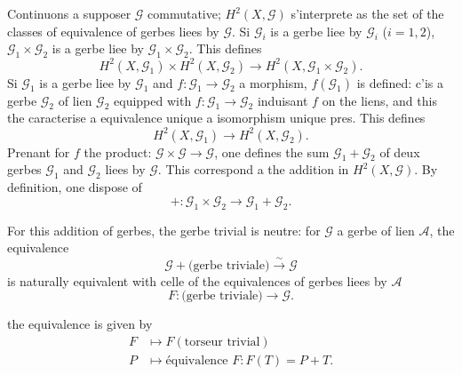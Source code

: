 \documentclass[12pt,a4paper]{article}
\theoremstyle{plain}
\theoremstyle{definition}
\theoremstyle{remark}
\begin{document}
Continuons a supposer $\mathscr{G}$ commutative; $H^2(X, \mathscr{G})$ s'interprete as the set
of the classes of equivalence of gerbes liees by $\mathscr{G}$. Si $\mathscr{G}_i$ is a gerbe liee by $\mathscr{G}_i$ ($i = 1, 2$),
$\mathscr{G}_1 \times \mathscr{G}_2$ is a gerbe liee by $\mathscr{G}_1 \times \mathscr{G}_2$. This defines
\[
H^2(X, \mathscr{G}_1) \times H^2(X, \mathscr{G}_2) \to H^2(X, \mathscr{G}_1 \times \mathscr{G}_2).
\]
Si $\mathscr{G}_1$ is a gerbe liee by $\mathscr{G}_1$ and $f : \mathscr{G}_1 \to \mathscr{G}_2$ a morphism, $f(\mathscr{G}_1)$ is defined: c'is
a gerbe $\mathscr{G}_2$ of lien $\mathscr{G}_2$ equipped with $f : \mathscr{G}_1 \to \mathscr{G}_2$ induisant $f$ on the liens, and this the caracterise a equivalence unique a isomorphism unique pres. This defines
\[
H^2(X, \mathscr{G}_1) \to H^2(X, \mathscr{G}_2).
\]
Prenant for $f$ the product: $\mathscr{G} \times \mathscr{G} \to \mathscr{G}$, one defines the sum $\mathscr{G}_1 + \mathscr{G}_2$ of deux gerbes $\mathscr{G}_1$
and $\mathscr{G}_2$ liees by $\mathscr{G}$. This correspond a the addition in $H^2(X, \mathscr{G})$. By definition, one dispose of
\begin{equation}\label{eq:5.3.1}
+ : \mathscr{G}_1 \times \mathscr{G}_2 \to \mathscr{G}_1 + \mathscr{G}_2.
\end{equation}

For this addition of gerbes, the gerbe trivial is neutre: for $\mathscr{G}$ a gerbe of lien
$\mathscr{A}$, the equivalence
\begin{equation}\label{eq:5.3.2}
\mathscr{G} + \text{(gerbe triviale)} \xrightarrow{\sim} \mathscr{G}
\end{equation}
is naturally equivalent with celle of the equivalences of gerbes liees by $\mathscr{A}$
\[
F : \text{(gerbe triviale)} \to \mathscr{G}.
\]

the equivalence is given by
\begin{align*}
F &\mapsto F(\text{torseur trivial}) \\
P &\mapsto \text{équivalence } F : F(T) = P + T.
\end{align*}
\end{document}
